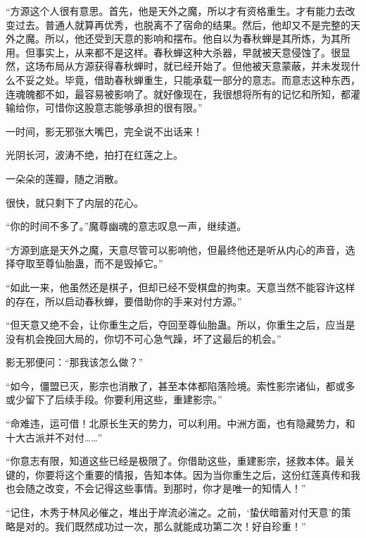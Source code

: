 \begin{this_body}
“方源这个人很有意思。首先，他是天外之魔，所以才有资格重生。才有能力去改变过去。普通人就算再优秀，也脱离不了宿命的结果。然后，他却又不是完整的天外之魔。所以，他还受到天意的影响和摆布。他自以为春秋蝉是其所炼，为其所用。但事实上，从来都不是这样。春秋蝉这种大杀器，早就被天意侵蚀了。很显然，这场布局从方源获得春秋蝉时，就已经开始了。但他被天意蒙蔽，并未发现什么不妥之处。毕竟，借助春秋蝉重生，只能承载一部分的意志。而意志这种东西，连魂魄都不如，最容易被影响了。就好像现在，我很想将所有的记忆和所知，都灌输给你，可惜你这股意志能够承担的很有限。”

一时间，影无邪张大嘴巴，完全说不出话来！

光阴长河，波涛不绝，拍打在红莲之上。

一朵朵的莲瓣，随之消散。

很快，就只剩下了内层的花心。

“你的时间不多了。”魔尊幽魂的意志叹息一声，继续道。

“方源到底是天外之魔，天意尽管可以影响他，但最终他还是听从内心的声音，选择夺取至尊仙胎蛊，而不是毁掉它。”

“如此一来，他虽然还是棋子，但却已经不受棋盘的拘束。天意当然不能容许这样的存在，所以启动春秋蝉，要借助你的手来对付方源。”

“但天意又绝不会，让你重生之后，夺回至尊仙胎蛊。所以，你重生之后，应当是没有机会挽回大局的，你切不可心急气躁，坏了这最后的机会。”

影无邪便问：“那我该怎么做？”

“如今，僵盟已灭，影宗也消散了，甚至本体都陷落险境。索性影宗诸仙，都或多或少留下了后续手段。你要利用这些，重建影宗。”

“命难违，运可借！北原长生天的势力，可以利用。中洲方面，也有隐藏势力，和十大古派并不对付……”

“你意志有限，知道这些已经是极限了。你借助这些，重建影宗，拯救本体。最关键的，你要将这个重要的情报，告知本体。因为当你重生之后，这份红莲真传和我也会随之改变，不会记得这些事情。到那时，你才是唯一的知情人！”

“记住，木秀于林风必催之，堆出于岸流必湍之。之前，‘蛰伏暗蓄对付天意’的策略是对的。我们既然成功过一次，那么就能成功第二次！好自珍重！”

\end{this_body}

